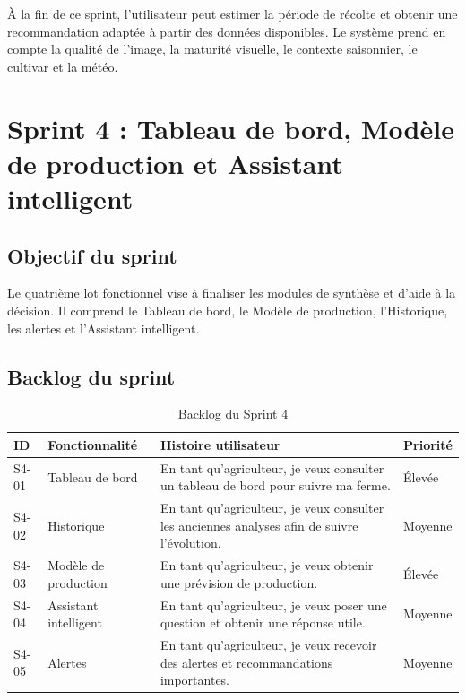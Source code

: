 \documentclass[12pt,a4paper]{report}
\begin{document}
À la fin de ce sprint, l'utilisateur peut estimer la période de récolte et obtenir une recommandation adaptée à partir des données disponibles. Le système prend en compte la qualité de l'image, la maturité visuelle, le contexte saisonnier, le cultivar et la météo.

\section{Sprint 4 : Tableau de bord, Modèle de production et Assistant intelligent}

\subsection{Objectif du sprint}

Le quatrième lot fonctionnel vise à finaliser les modules de synthèse et d'aide à la décision. Il comprend le Tableau de bord, le Modèle de production, l'Historique, les alertes et l'Assistant intelligent.

\subsection{Backlog du sprint}

\begin{table}[H]
\centering
\caption{Backlog du Sprint 4}
\label{tab:backlog-sprint4}
\begin{tabular}{|p{1.4cm}|p{4.5cm}|p{6.6cm}|p{2cm}|}
\hline
\textbf{ID} & \textbf{Fonctionnalité} & \textbf{Histoire utilisateur} & \textbf{Priorité} \\
\hline
S4-01 & Tableau de bord & En tant qu'agriculteur, je veux consulter un tableau de bord pour suivre ma ferme. & Élevée \\
\hline
S4-02 & Historique & En tant qu'agriculteur, je veux consulter les anciennes analyses afin de suivre l'évolution. & Moyenne \\
\hline
S4-03 & Modèle de production & En tant qu'agriculteur, je veux obtenir une prévision de production. & Élevée \\
\hline
S4-04 & Assistant intelligent & En tant qu'agriculteur, je veux poser une question et obtenir une réponse utile. & Moyenne \\
\hline
S4-05 & Alertes & En tant qu'agriculteur, je veux recevoir des alertes et recommandations importantes. & Moyenne \\
\hline
\end{tabular}
\end{table}
\end{document}
